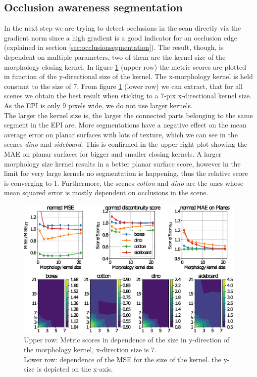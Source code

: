 \documentclass  [
  paper    = a4,
  BCOR     = 10mm,
  twoside,
  fontsize = 12pt,
  fleqn,
  toc      = bibnumbered,
  toc      = listofnumbered,
  numbers  = noendperiod,
  headings = normal,
  listof   = leveldown,
  version  = 3.03
]                                       {scrreprt}
\begin{document}
\subsection{Occlusion awareness segmentation}
\label{sec:occlusionawareness}
In the next step we are trying to detect occlusions in the scan directly via the gradient norm since a high gradient is a good indicator for an occlusion edge (explained in section \ref{sec:occlusionsegmentation}). The result, though, is dependent on multiple parameters, two of them are the kernel size of the morphology closing kernel. In figure \ref{fig:threshsegmmorph} (upper row) the metric scores are plotted in function of the y-directional size of the kernel. The x-morphology kernel is held constant to the size of 7. From figure \ref{fig:threshsegmmorph} (lower row) we can extract, that for all scenes we obtain the best result when sticking to a 7-pix x-directional kernel size. As the EPI is only 9 pixels wide, we do not use larger kernels.\\
The larger the kernel size is, the larger the connected parts belonging to the same segment in the EPI are. More segmentations have a negative effect on the mean average error on planar surfaces with lots of texture, which we can see in the scenes \textit{dino} and \textit{sideboard}. This is confirmed in the upper right plot showing the MAE on planar surfaces for bigger and smaller closing kernels. A larger morphology size kernel results in a better planar surface score, however in the limit for very large kernels no segmentation is happening, thus the relative score is converging to 1. Furthermore, the scenes \textit{cotton} and \textit{dino} are the ones whose mean squared error is mostly dependent on occlusions in the scene. 
\begin{figure}[h!]
	\centering
	\includegraphics[width=1\linewidth]{images/thresh_segm_morph}
	\caption[Segmentation of EPI dependence on the morphology kernel]{Upper row: Metric scores in dependence of the size in y-direction of the morphology kernel, x-direction size is 7.\\ Lower row: dependence of the MSE for the size of the kernel. the y-size is depicted on the x-axis.}
	\label{fig:threshsegmmorph}
\end{figure}
\end{document}
